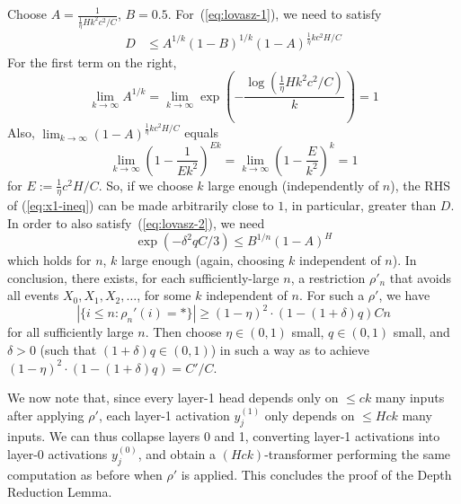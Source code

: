 \documentclass[11pt,a4paper]{article}
\begin{document}
Choose %
$A=\frac{1}{\frac{1}{\eta}Hk^2c^2/C}$, $B=0.5$.
For~(\ref{eq:lovasz-1}), we need to satisfy
\begin{align}\label{eq:x1-ineq}
    D &\leq A^{1/k}(1-B)^{1/k}(1-A)^{\frac{1}{\eta}kc^2H/C} 
\end{align}
For the first term on the right, 
\begin{equation}
\lim_{k\rightarrow \infty} A^{1/k} = \lim_{k\rightarrow \infty} \exp\left(-\frac{\log\left(\frac{1}{\eta} H k^2 c^2/C\right)}{k}\right) = 1
\end{equation}
Also, $\lim_{k\rightarrow \infty} (1-A)^{\frac{1}{\eta}kc^2H/C}$ equals
\begin{equation}
\lim_{k\rightarrow \infty} \left(1-\frac{1}{Ek^2}\right)^{Ek} = \lim_{k\rightarrow \infty} \left(1-\frac{E}{k^2}\right)^{k} = 1
\end{equation}
for $E := \frac{1}{\eta}c^2H/C$. So, if we choose $k$ large enough (independently of $n$), the RHS of (\ref{eq:x1-ineq}) can be made arbitrarily close to $1$, in particular, greater than $D$.
In order to also satisfy~(\ref{eq:lovasz-2}), we need
\begin{equation}
\exp\left(-\delta^2qC/3\right)  \leq B^{1/n} (1-A)^H
\end{equation}
which holds for $n$, $k$ large enough (again, choosing $k$ independent of $n$). 
In conclusion, there exists, for each sufficiently-large $n$, a restriction $\rho'_n$ that avoids all events $X_0, X_1, X_2, \dots$, for some $k$ independent of $n$.
For such a $\rho'$, we have
\begin{equation*}
|\{i \leq n: \rho_n'(i) = *\}|\geq (1-\eta)^2\cdot (1-(1+\delta)q) C n
\end{equation*}
for all sufficiently large $n$.
Then choose $\eta \in (0,1)$ small, $q \in (0,1)$ small, and $\delta >0$ (such that $(1+\delta)q \in (0,1)$) in such a way as to achieve $(1-\eta)^2\cdot (1-(1+\delta)q) = C'/C$.




We now note that, since every layer-1 head depends only on $\leq ck$ many inputs after applying $\rho'$, each layer-1 activation $y_j^{(1)}$ only depends on $\leq Hck$ many inputs.
We can thus collapse layers 0 and 1, converting layer-1 activations into layer-0 activations $y_j^{(0)}$, and obtain a $(Hck)$-transformer performing the same computation as before when $\rho'$ is applied.
This concludes the proof of the Depth Reduction Lemma.
\end{document}
